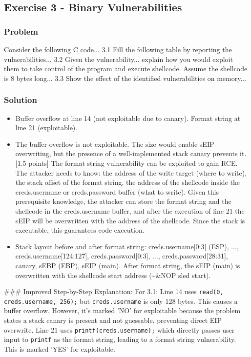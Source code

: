 \documentclass{article}
\begin{document}
\subsection{Exercise 3 - Binary Vulnerabilities}
\subsubsection*{Problem}
Consider the following C code... 3.1 Fill the following table by reporting the vulnerabilities... 3.2 Given the vulnerability... explain how you would exploit them to take control of the program and execute shellcode. Assume the shellcode is 8 bytes long... 3.3 Show the effect of the identified vulnerabilities on memory...

\subsubsection*{Solution}
\begin{itemize}
    \item[\textbf{3.1}] Buffer overflow at line 14 (not exploitable due to canary). Format string at line 21 (exploitable).

    \item[\textbf{3.2}] [0.5 points] The buffer overflow is not exploitable. The size would enable sEIP overwriting, but the presence of a well-implemented stack canary prevents it. [1.5 points] The format string vulnerability can be exploited to gain RCE. The attacker needs to know: the address of the write target (where to write), the stack offset of the format string, the address of the shellcode inside the creds.username or creds.password buffer (what to write). Given this prerequisite knowledge, the attacker can store the format string and the shellcode in the creds.username buffer, and after the execution of line 21 the sEIP will be overwritten with the address of the shellcode. Since the stack is executable, this guarantees code execution.

    \item[\textbf{3.3}] Stack layout before and after format string: creds.username[0:3] (ESP), ..., creds.username[124:127], creds.password[0:3], ..., creds.password[28:31], canary, sEBP (EBP), sEIP (main). After format string, the sEIP (main) is overwritten with the shellcode start address (\textasciitilde{}\&NOP sled start).

\end{itemize}
\#\#\# Improved Step-by-Step Explanation:
For 3.1: Line 14 uses \texttt{read(0, creds.username, 256);} but \texttt{creds.username} is only 128 bytes. This causes a buffer overflow. However, it's marked 'NO' for exploitable because the problem states a stack canary is present and not guessable, preventing direct EIP overwrite. Line 21 uses \texttt{printf(creds.username);} which directly passes user input to \texttt{printf} as the format string, leading to a format string vulnerability. This is marked 'YES' for exploitable.
\end{document}
